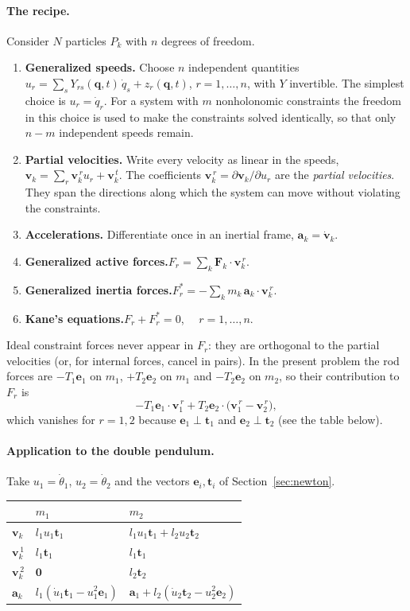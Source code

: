 \documentclass[11pt,a4paper]{book}
\theoremstyle{definition}
\theoremstyle{remark}
\begin{document}
\paragraph{The recipe.} Consider $N$ particles $P_k$ with $n$ degrees of freedom.
\begin{enumerate}
  \item \textbf{Generalized speeds.} Choose $n$ independent quantities
        $u_r=\sum_sY_{rs}(\bm q,t)\,\dot q_s+z_r(\bm q,t)$, $r=1,\dots,n$, with $Y$ invertible. The simplest choice
        is $u_r=\dot q_r$. For a system with $m$ nonholonomic constraints the freedom in this choice is used to make
        the constraints solved identically, so that only $n-m$ independent speeds remain.
  \item \textbf{Partial velocities.} Write every velocity as linear in the speeds,
        $\bm v_k=\sum_r\bm v_k^{\,r}u_r+\bm v_k^{\,t}$. The coefficients
        $\bm v_k^{\,r}=\partial\bm v_k/\partial u_r$ are the \emph{partial velocities}. They span the directions along which
        the system can move without violating the constraints.
  \item \textbf{Accelerations.} Differentiate once in an inertial frame, $\bm a_k=\dot{\bm v}_k$.
  \item \textbf{Generalized active forces.}\quad $F_r=\sum_k\bm F_k\cdot\bm v_k^{\,r}$.
  \item \textbf{Generalized inertia forces.}\quad $F_r^*=-\sum_km_k\,\bm a_k\cdot\bm v_k^{\,r}$.
  \item \textbf{Kane's equations.}\quad $F_r+F_r^*=0$, $\quad r=1,\dots,n$.
\end{enumerate}
Ideal constraint forces never appear in $F_r$: they are orthogonal to the partial velocities (or, for internal
forces, cancel in pairs). In the present problem the rod forces are $-T_1\bm e_1$ on $m_1$, $+T_2\bm e_2$ on $m_1$ and
$-T_2\bm e_2$ on $m_2$, so their contribution to $F_r$ is
\[
  -T_1\bm e_1\cdot\bm v_1^{\,r}+T_2\bm e_2\cdot\big(\bm v_1^{\,r}-\bm v_2^{\,r}\big),
\]
which vanishes for $r=1,2$ because $\bm e_1\perp\bm t_1$ and $\bm e_2\perp\bm t_2$ (see the table below).

\paragraph{Application to the double pendulum.} Take $u_1=\dot\theta_1$, $u_2=\dot\theta_2$ and the vectors
$\bm e_i,\bm t_i$ of Section~\ref{sec:newton}.

\begin{center}
\renewcommand{\arraystretch}{1.3}
\begin{tabular}{@{}lll@{}}
\toprule
 & $m_1$ & $m_2$\\
\midrule
$\bm v_k$ & $l_1u_1\bm t_1$ & $l_1u_1\bm t_1+l_2u_2\bm t_2$\\
$\bm v_k^{\,1}$ & $l_1\bm t_1$ & $l_1\bm t_1$\\
$\bm v_k^{\,2}$ & $\bm 0$ & $l_2\bm t_2$\\
$\bm a_k$ & $l_1(\dot u_1\bm t_1-u_1^2\bm e_1)$ & $\bm a_1+l_2(\dot u_2\bm t_2-u_2^2\bm e_2)$\\
\bottomrule
\end{tabular}
\end{center}
\end{document}
